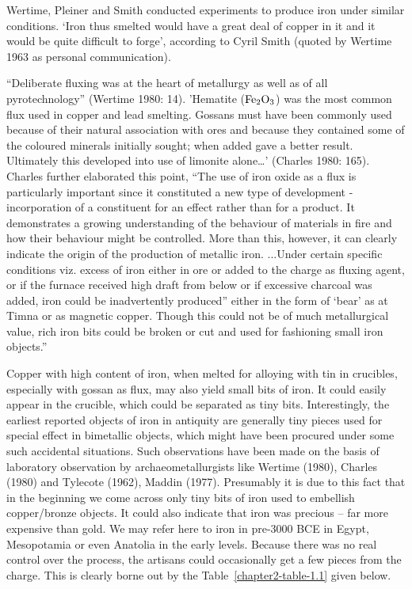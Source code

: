 Wertime, Pleiner and Smith conducted experiments to produce iron under similar conditions. ‘Iron thus smelted would have a great deal of copper in it and it would be quite difficult to forge’, according to Cyril Smith (quoted by Wertime 1963 as personal communication).

{\footnotesize “Deliberate fluxing was at the heart of metallurgy as well as of all pyrotechnology” (Wertime 1980: 14). 'Hematite ({$\rm Fe_{2}O_{3}$}) was the most common flux used in copper and lead smelting. Gossans must have been commonly used because of their natural association with ores and because they contained some of the coloured minerals initially sought; when added gave a better result. Ultimately this developed into use of limonite alone…' (Charles 1980: 165). Charles further elaborated this point, “The use of iron oxide as a flux is particularly important since it constituted a new type of development - incorporation of a constituent for an effect rather than for a product. It demonstrates a growing understanding of the behaviour of materials in fire and how their behaviour might be controlled. More than this, however, it can clearly indicate the origin of the production of metallic iron. ...Under certain specific conditions viz. excess of iron either in ore or added to the charge as fluxing agent, or if the furnace received high draft from below or if excessive charcoal was added, iron could be inadvertently produced” either in the form of ‘bear’ as at Timna or as magnetic copper. Though this could not be of much metallurgical value, rich iron bits could be broken or cut and used for fashioning small iron objects.”}

Copper with high content of iron, when melted for alloying with tin in crucibles, especially with gossan as flux, may also yield small bits of iron. It could easily appear in the crucible, which could be separated as tiny bits.  Interestingly, the earliest reported objects of iron in antiquity are generally tiny pieces used for special effect in bimetallic objects, which might have been procured under some such accidental situations. Such observations have been made on the basis of laboratory observation by archaeometallurgists like Wertime (1980), Charles (1980) and Tylecote (1962), Maddin (1977). Presumably it is due to this fact that in the beginning we come across only tiny bits of iron used to embellish copper/bronze objects. It could also indicate that iron was precious – far more expensive than gold. We may refer here to iron in pre-3000 BCE in Egypt, Mesopotamia or even Anatolia in the early levels. Because there was no real control over the process, the artisans could occasionally get a few pieces from the charge.  This is clearly borne out by the Table~\ref{chapter2-table-1.1} given below. 

